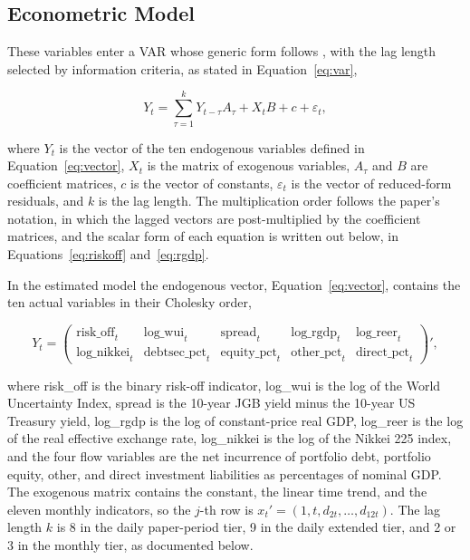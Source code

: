 \subsection{Econometric Model}

These variables enter a VAR whose generic form follows \textcite{beirne_sugandi_2023}, with the lag length selected by information criteria, as stated in Equation~\eqref{eq:var},

\begin{equation}
  Y_t = \sum_{\tau = 1}^{k} Y_{t - \tau} A_\tau + X_t B + c + \varepsilon_t,
  \label{eq:var}
\end{equation}

where \(Y_t\) is the vector of the ten endogenous variables defined in Equation~\eqref{eq:vector}, \(X_t\) is the matrix of exogenous variables, \(A_\tau\) and \(B\) are coefficient matrices, \(c\) is the vector of constants, \(\varepsilon_t\) is the vector of reduced-form residuals, and \(k\) is the lag length. The multiplication order follows the paper's notation, in which the lagged vectors are post-multiplied by the coefficient matrices, and the scalar form of each equation is written out below, in Equations~\eqref{eq:riskoff} and~\eqref{eq:rgdp}.

In the estimated model the endogenous vector, Equation~\eqref{eq:vector}, contains the ten actual variables in their Cholesky order,

\begin{equation}
  Y_t = \begin{pmatrix} \text{risk\_off}_t & \text{log\_wui}_t & \text{spread}_t & \text{log\_rgdp}_t & \text{log\_reer}_t \\
  \text{log\_nikkei}_t & \text{debtsec\_pct}_t & \text{equity\_pct}_t & \text{other\_pct}_t & \text{direct\_pct}_t \end{pmatrix}',
  \label{eq:vector}
\end{equation}

where risk\_off is the binary risk-off indicator, log\_wui is the log of the World Uncertainty Index, spread is the 10-year JGB yield minus the 10-year US Treasury yield, log\_rgdp is the log of constant-price real GDP, log\_reer is the log of the real effective exchange rate, log\_nikkei is the log of the Nikkei 225 index, and the four flow variables are the net incurrence of portfolio debt, portfolio equity, other, and direct investment liabilities as percentages of nominal GDP. The exogenous matrix contains the constant, the linear time trend, and the eleven monthly indicators, so the \(j\)-th row is \(x_t' = (1, t, d_{2t}, \ldots, d_{12t})\). The lag length \(k\) is 8 in the daily paper-period tier, 9 in the daily extended tier, and 2 or 3 in the monthly tier, as documented below.

